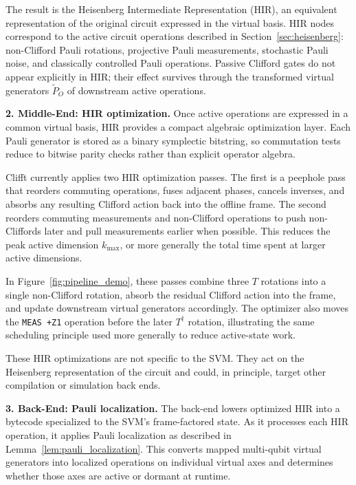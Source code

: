 \documentclass[a4paper, onecolumn, unpublished]{quantumarticle}
\begin{document}
    The result is the Heisenberg Intermediate Representation (HIR), an equivalent representation of the original circuit expressed in the virtual basis. HIR nodes correspond to the active circuit operations described in Section~\ref{sec:heisenberg}: non-Clifford Pauli rotations, projective Pauli measurements, stochastic Pauli noise, and classically controlled Pauli operations. Passive Clifford gates do not appear explicitly in HIR; their effect survives through the transformed virtual generators $\tilde{P}_O$ of downstream active operations.

    \textbf{2. Middle-End: HIR optimization.}
    Once active operations are expressed in a common virtual basis, HIR provides a compact algebraic optimization layer. Each Pauli generator is stored as a binary symplectic bitstring, so commutation tests reduce to bitwise parity checks rather than explicit operator algebra.

    Clifft currently applies two HIR optimization passes. The first is a peephole pass that reorders commuting operations, fuses adjacent phases, cancels inverses, and absorbs any resulting Clifford action back into the offline frame. The second reorders commuting measurements and non-Clifford operations to push non-Cliffords later and pull measurements earlier when possible. This reduces the peak active dimension $k_{\max}$, or more generally the total time spent at larger active dimensions.

    In Figure~\ref{fig:pipeline_demo}, these passes combine three $T$ rotations into a single non-Clifford rotation, absorb the residual Clifford action into the frame, and update downstream virtual generators accordingly. The optimizer also moves the \texttt{MEAS +Z1} operation before the later $T^\dagger$ rotation, illustrating the same scheduling principle used more generally to reduce active-state work.

    These HIR optimizations are not specific to the SVM. They act on the Heisenberg representation of the circuit and could, in principle, target other compilation or simulation back ends.

    \textbf{3. Back-End: Pauli localization.}
    The back-end lowers optimized HIR into a bytecode specialized to the SVM's frame-factored state. As it processes each HIR operation, it applies Pauli localization as described in Lemma~\ref{lem:pauli_localization}. This converts mapped multi-qubit virtual generators into localized operations on individual virtual axes and determines whether those axes are active or dormant at runtime.
\end{document}
